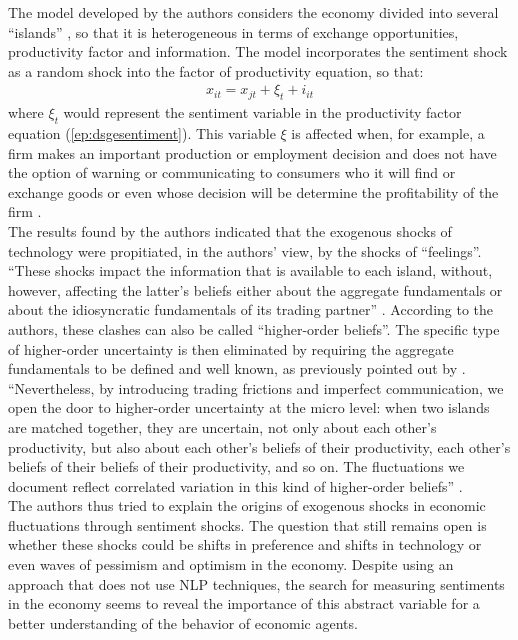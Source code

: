 The model developed by the authors considers the economy divided into several ``islands'' \cite{lucas1972expectations}, so that it is heterogeneous in terms of exchange opportunities, productivity factor and information. The model incorporates the sentiment shock as a random shock into the factor of productivity equation, so that:
\begin{align} \label{ep:dsgesentiment}
     x_{it} = x_{jt} + \xi_t + i_{it}
\end{align}
where $\xi_t$ would represent the sentiment variable in the productivity factor equation (\ref{ep:dsgesentiment}). This variable $\xi$ is affected when, for example, a firm makes an important production or employment decision and does not have the option of warning or communicating to consumers who it will find or exchange goods or even whose decision will be determine the profitability of the firm \cite[p.741]{angeletos2013sentiments}.\\

The results found by the authors indicated that the exogenous shocks of technology were propitiated, in the authors' view, by the shocks of ``feelings''. ``These shocks impact the information that is available to each island, without, however, affecting the latter's beliefs either about the aggregate fundamentals or about the idiosyncratic fundamentals of its trading partner'' \cite[p.742]{angeletos2013sentiments}. According to the authors, these clashes can also be called ``higher-order beliefs''. The specific type of higher-order uncertainty is then eliminated by requiring the aggregate fundamentals to be defined and well known, as previously pointed out by \cite{morris2002social, woodford2001imperfect}. ``Nevertheless, by introducing trading frictions and imperfect communication, we open the door to higher-order uncertainty at the micro level: when two islands are matched together, they are uncertain, not only about each other's productivity, but also about each other's beliefs of their productivity, each other's beliefs of their beliefs of their productivity, and so on. The fluctuations
we document reflect correlated variation in this kind of higher-order beliefs'' \cite[p.742]{angeletos2013sentiments}.\\

The authors thus tried to explain the origins of exogenous shocks in economic fluctuations through sentiment shocks. The question that still remains open is whether these shocks could be shifts in preference and shifts in technology or even waves of pessimism and optimism in the economy. Despite using an approach that does not use NLP techniques, the search for measuring sentiments in the economy seems to reveal the importance of this abstract variable for a better understanding of the behavior of economic agents.\\

